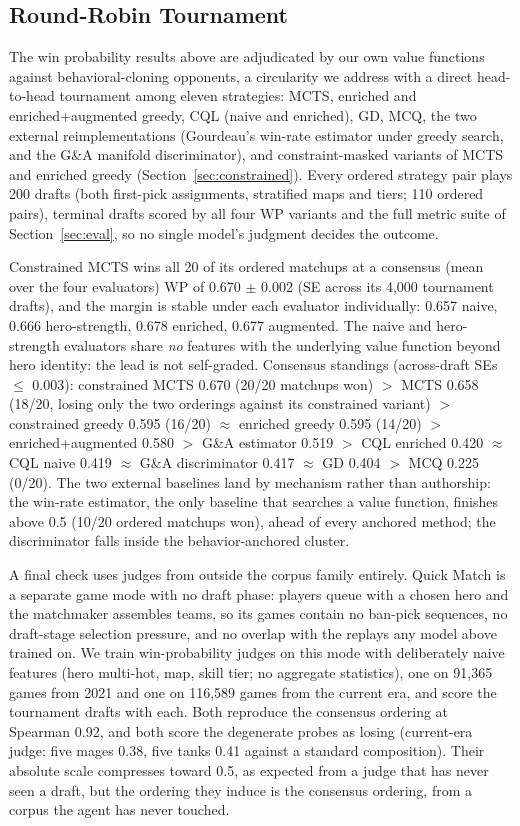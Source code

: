 \documentclass[journal]{IEEEtran}
\begin{document}
\subsection{Round-Robin Tournament}
\label{sec:tournament}

The win probability results above are adjudicated by our own value functions against behavioral-cloning opponents, a circularity we address with a direct head-to-head tournament among eleven strategies: MCTS, enriched and enriched+augmented greedy, CQL (naive and enriched), GD, MCQ, the two external reimplementations (Gourdeau's win-rate estimator under greedy search, and the G\&A manifold discriminator), and constraint-masked variants of MCTS and enriched greedy (Section~\ref{sec:constrained}). Every ordered strategy pair plays 200 drafts (both first-pick assignments, stratified maps and tiers; 110 ordered pairs), terminal drafts scored by all four WP variants and the full metric suite of Section~\ref{sec:eval}, so no single model's judgment decides the outcome.

Constrained MCTS wins all 20 of its ordered matchups at a consensus (mean over the four evaluators) WP of 0.670 $\pm$ 0.002 (SE across its 4{,}000 tournament drafts), and the margin is stable under each evaluator individually: 0.657 naive, 0.666 hero-strength, 0.678 enriched, 0.677 augmented. The naive and hero-strength evaluators share \textit{no} features with the underlying value function beyond hero identity: the lead is not self-graded. Consensus standings (across-draft SEs $\leq$ 0.003): constrained MCTS 0.670 (20/20 matchups won) $>$ MCTS 0.658 (18/20, losing only the two orderings against its constrained variant) $>$ constrained greedy 0.595 (16/20) $\approx$ enriched greedy 0.595 (14/20) $>$ enriched+augmented 0.580 $>$ G\&A estimator 0.519 $>$ CQL enriched 0.420 $\approx$ CQL naive 0.419 $\approx$ G\&A discriminator 0.417 $\approx$ GD 0.404 $>$ MCQ 0.225 (0/20). The two external baselines land by mechanism rather than authorship: the win-rate estimator, the only baseline that searches a value function, finishes above 0.5 (10/20 ordered matchups won), ahead of every anchored method; the discriminator falls inside the behavior-anchored cluster.

A final check uses judges from outside the corpus family entirely. Quick Match is a separate game mode with no draft phase: players queue with a chosen hero and the matchmaker assembles teams, so its games contain no ban-pick sequences, no draft-stage selection pressure, and no overlap with the replays any model above trained on. We train win-probability judges on this mode with deliberately naive features (hero multi-hot, map, skill tier; no aggregate statistics), one on 91{,}365 games from 2021 and one on 116{,}589 games from the current era, and score the tournament drafts with each. Both reproduce the consensus ordering at Spearman 0.92, and both score the degenerate probes as losing (current-era judge: five mages 0.38, five tanks 0.41 against a standard composition). Their absolute scale compresses toward 0.5, as expected from a judge that has never seen a draft, but the ordering they induce is the consensus ordering, from a corpus the agent has never touched.
\end{document}
